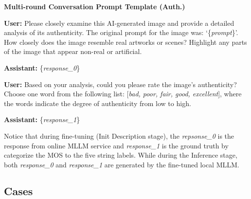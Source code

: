 \begin{mdframed}[linecolor=black,linewidth=0.5pt,roundcorner=10pt]
    \textbf{Multi-round Conversation Prompt Template (Auth.)}
    
    \textbf{User:} Please closely examine this AI-generated image and provide a detailed analysis of its authenticity. The original prompt for the image was: `\{\textit{prompt}\}'. How closely does the image resemble real artworks or scenes? Highlight any parts of the image that appear non-real or artificial.
    
    \textbf{Assistant:} \{\textit{response\_0}\}
    
    \textbf{User:} Based on your analysis, could you please rate the image's authenticity? Choose one word from the following list: [\textit{bad, poor, fair, good, excellent}], where the words indicate the degree of authenticity from low to high.
    
    \textbf{Assistant:} \{\textit{response\_1}\}
    \end{mdframed}

Notice that during fine-tuning (Init Description stage), the \textit{repsonse\_0} is the response from online MLLM service and \textit{response\_1} is the ground truth by categorize the MOS to the five string labels.
While during the Inference stage, both \textit{response\_0} and \textit{response\_1} are generated by the fine-tuned local MLLM.

\subsection{Cases}
